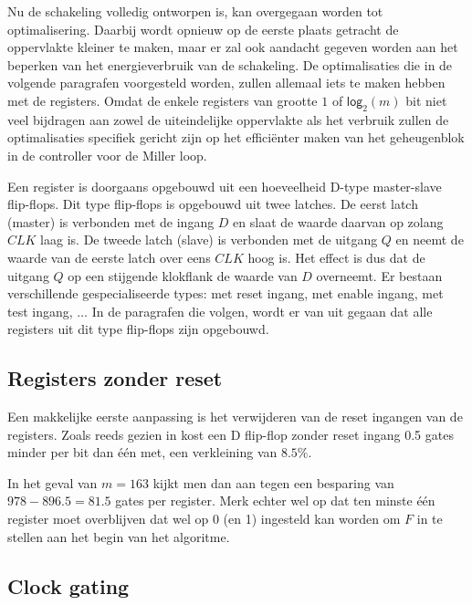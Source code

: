 Nu de schakeling volledig ontworpen is, kan overgegaan worden tot optimalisering. Daarbij wordt opnieuw op de eerste plaats getracht de oppervlakte kleiner te maken, maar er zal ook aandacht gegeven worden aan het beperken van het energieverbruik van de schakeling. De optimalisaties die in de volgende paragrafen voorgesteld worden, zullen allemaal iets te maken hebben met de registers. Omdat de enkele registers van grootte $1$ of $\textsf{log}_2(m)$ bit niet veel bijdragen aan zowel de uiteindelijke oppervlakte als het verbruik zullen de optimalisaties specifiek gericht zijn op het effici\"enter maken van het geheugenblok in de controller voor de Miller loop.

Een register is doorgaans opgebouwd uit een hoeveelheid D-type master-slave flip-flops. Dit type flip-flops is opgebouwd uit twee latches. De eerst latch (master) is verbonden met de ingang $D$ en slaat de waarde daarvan op zolang $CLK$ laag is. De tweede latch (slave) is verbonden met de uitgang $Q$  en neemt de waarde van de eerste latch over eens $CLK$ hoog is. Het effect is dus dat de uitgang $Q$ op een stijgende klokflank de waarde van $D$ overneemt. Er bestaan verschillende gespecialiseerde types: met reset ingang, met enable ingang, met test ingang, $\ldots$ In de paragrafen die volgen, wordt er van uit gegaan dat alle registers uit dit type flip-flops zijn opgebouwd.

\subsection{Registers zonder reset}

Een makkelijke eerste aanpassing is het verwijderen van de reset ingangen van de registers. Zoals reeds gezien in  kost een D flip-flop zonder reset ingang 0.5 gates minder per bit dan \'e\'en met, een verkleining van $8.5\%$.

In het geval van $m = 163$ kijkt men dan aan tegen een besparing van $978 - 896.5 = 81.5$ gates per register. Merk echter wel op dat ten minste \'e\'en register moet overblijven dat wel op 0 (en 1) ingesteld kan worden om $F$ in te stellen aan het begin van het algoritme.

\subsection{Clock gating\label{subsectie-implementatie-optimalisatie-clock-gating}}



